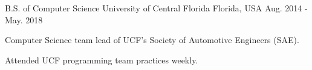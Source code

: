 

\begin{cventries}

  \cventry
    {B.S. of Computer Science} %
    {University of Central Florida} %
    {Florida, USA} %
    {Aug. 2014 - May. 2018} %
    {
      \begin{cvitems} %
        \item {Computer Science team lead of UCF’s Society of Automotive Engineers (SAE).}
        \item {Attended UCF programming team practices weekly.}
      \end{cvitems}
    }

\end{cventries}
